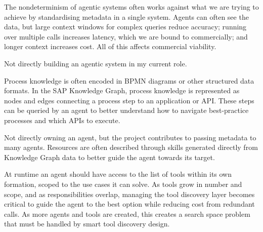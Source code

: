 \medskip{}

The nondeterminism of agentic systems often works against what we are trying to achieve by standardising metadata in a single system. Agents can often see the data, but large context windows for complex queries reduce accuracy; running over multiple calls increases latency, which we are bound to commercially; and longer context increases cost. All of this affects commercial viability.

\medskip{}

Not directly building an agentic system in my current role.

\medskip{}

Process knowledge is often encoded in BPMN diagrams or other structured data formats. In the SAP Knowledge Graph, process knowledge is represented as nodes and edges connecting a process step to an application or API. These steps can be queried by an agent to better understand how to navigate best-practice processes and which APIs to execute.

\medskip{}

Not directly owning an agent, but the project contributes to passing metadata to many agents. Resources are often described through skills generated directly from Knowledge Graph data to better guide the agent towards its target.

\medskip{}

At runtime an agent should have access to the list of tools within its own formation, scoped to the use cases it can solve. As tools grow in number and scope, and as responsibilities overlap, managing the tool discovery layer becomes critical to guide the agent to the best option while reducing cost from redundant calls. As more agents and tools are created, this creates a search space problem that must be handled by smart tool discovery design.

\medskip{}

